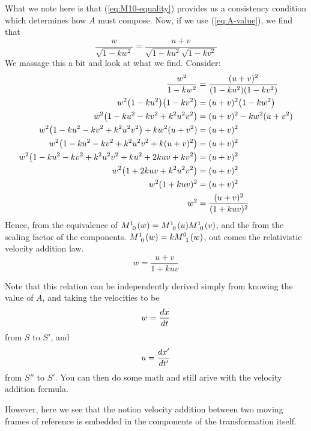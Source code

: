 \begin{solution_pset}
		What we note here is that (\ref{eq:M10-equality}) 
		provides us a consistency condition which determines 
		how $A$ must compose. Now, if we use (\ref{eq:A-value}),
		we find that
		\[ 
			\frac{w}{\sqrt{1 - kw^2}} 
			=
			\frac{u+v}{
				\sqrt{1 - ku^2} 
				\sqrt{1 - kv^2} 
			} 
		\]
		We massage this a bit and look at what we find.
		Consider:
		\begin{align*}
			\frac{w^2}{{1 - kw^2}} 
			&=
			\frac{(u+v)^2}{
				{
					(1 - ku^2)
				} 
				{
					(1 - kv^2)
				} 
			} 
			\\
			w^2
			\pqty{1 - ku^2}
			\pqty{1 - kv^2}
			&=
			(u+v)^2 
			\pqty{1 - kw^2}\\
			w^2
			\pqty{1 - ku^2 - kv^2 + k^2 u^2 v^2}
			&=
			(u+v)^2 
			- kw^2(u+v^2)\\
			w^2
			\pqty{1 - ku^2 - kv^2 + k^2 u^2 v^2}
			+ 
			kw^2(u+v^2)
			&=
			(u+v)^2 \\
			w^2
			\pqty{
				1 - 
				ku^2 - 
				kv^2 + k^2 u^2 v^2 + 
				k(u+v)^2
			}
			&=
			(u+v)^2 \\
			w^2
			\pqty{
				1 - 
				ku^2 - 
				kv^2 + k^2 u^2 v^2 + 
				ku^2 + 2kuv + kv^2
			}
			&=
			(u+v)^2 \\
			w^2
			\pqty{
				1 +
				2kuv + 
				k^2 u^2 v^2 
			}
			&=
			(u+v)^2 \\
			w^2
			(1 + kuv)^2
			&=
			(u+v)^2 \\
			w^2
			&=
			\frac{
				(u+v)^2 
			}{
				(1 + kuv)^2
			} 
		\end{align*}
		Hence, from the equivalence of $M\indices{^1_0}(w) = 
		M\indices{^1_0}(u) 
		M\indices{^1_0}(v) 
		$,
		and the from the scaling factor
		of the components.
		$
		M\indices{^1_0}(w)
		=
		k 
		M\indices{^0_1}(w)
		$,
		out comes the relativistic velocity
		addition law.
		\begin{equation}
			\label{eq:w=u+v}
			\boxed{
				w
				=
				\frac{
					u+v
				}{
					1 + kuv
				}
			}
		\end{equation}

		Note that this relation can be independently
		derived simply from knowing the value of $A$,
		and taking the velocities to be 
		\[
			w = \dv{x}{t} 
		\]
		from $S$ to $S'$,
		and
		\[
			u = \dv{x'}{t'} 
		\]
		from $S''$ to $S'$. You can then do some math
		and still arive with the velocity addition formula.

		However, here we see that the notion velocity addition
		between two moving frames of reference
		is embedded in the components of the transformation itself.
		
	\end{solution_pset}
	\newpage
